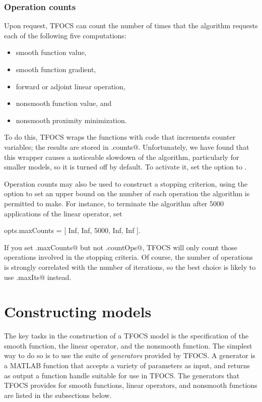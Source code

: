 \documentclass{article}
\begin{document}
\subsubsection{Operation counts}
\label{sec:opcounts}

Upon request, TFOCS can count the number of times that the algorithm requests each of the following
five computations:
\begin{itemize}
\itemsep 0pt
\item smooth function value,
\item smooth function gradient,
\item forward or adjoint linear operation,
\item nonsmooth function value, and
\item nonsmooth proximity minimization.
\end{itemize}
To do this, TFOCS wraps the functions with code that
increments counter variables; the results are stored in \verb@out.counts@.
Unfortunately, we have found that this wrapper causes
a noticeable slowdown of the 
algorithm, particularly for smaller models, so it is turned off by default.
To activate it, set the \verb@countOpts@ option to \verb@true@. 

Operation counts may also be used to construct a stopping criterion,
using the \verb@maxCounts@ option to set an upper bound on the number
of each operation the algorithm is permitted to make.
For instance, to terminate the algorithm after 5000 applications
of the linear operator, set
\begin{code}
	opts.maxCounts = [ Inf, Inf, 5000, Inf, Inf ].
\end{code}
If you set \verb@opts.maxCounts@ but not \verb@opts.countOps@,
TFOCS will only count those operations involved in the stopping criteria.
Of course, the number of operations is strongly correlated with
the number of iterations, so the best choice is likely to use
\verb@opts.maxIts@ instead.

\section{Constructing models}
\label{sec:functions}

The key tasks in the construction of a TFOCS model is the
specification of the smooth function, the linear operator, and
the nonsmooth function. The simplest way to do so is to use
the suite of \emph{generators} provided by TFOCS. A 
generator is a MATLAB function that accepts a variety of parameters
as input, and returns as output a function handle suitable for use in TFOCS. 
The generators that TFOCS provides for smooth functions, linear operators,
and nonsmooth functions are listed in the subsections below.
\end{document}
